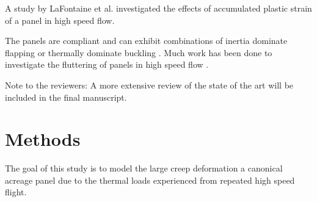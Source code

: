 \documentclass[conf]{new-aiaa}
\begin{document}
A study by LaFontaine et al.
\cite{
  lafontaine_effects_of_strain_hardeing_on_response_of_skin_panels_in_hypersonic_flow}
investigated the effects of accumulated 
plastic strain of a panel in high speed flow.



The panels are compliant and can exhibit combinations of
inertia dominate flapping or thermally dominate buckling
\cite{
  thornton_coupled_flow_thermal_and_structural_analysis_of_aerodynamically_heated_panels,
  mei_review_of_nonlinear_panel_flutter_at_supersonic_and_hypersonic_speeds}.
Much work has been done to investigate the fluttering 
of panels in high speed flow
\cite{
  mcnamara_aeroelastic_and_aerothermoelastic_analysis_in_hypersonic_flow_past_present_and_future,
  riley_interaction_between_aerothermally_compliant_structures_and_boudnary_layer_transition_in_hypersonic_flow,
  spottswood_exploring_the_response_of_a_thin_flexible_panel,
  savino_aerothermodynamic_study_of_ultrahigh_termperature_cermaic_winglet_for_atmospheric_reentry_test,
  nydick_hypersonic_panel_flutter_studies_on_cruved_panels,
  lafontaine_effects_of_strain_hardeing_on_response_of_skin_panels_in_hypersonic_flow}.


Note to the reviewers: A more extensive review of the 
state of the art will be included in the 
final manuscript.

\section{Methods} \label{sec_methods}

The goal of this study is to model the large creep deformation a canonical acreage
panel due to the thermal loads experienced from repeated high speed flight.



% 


\end{document}
